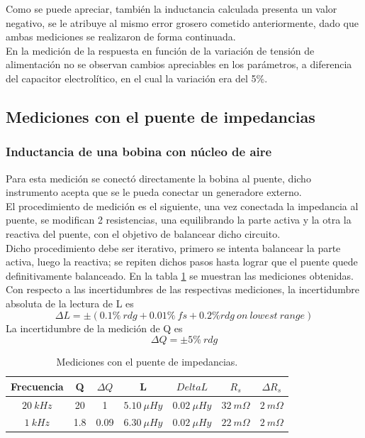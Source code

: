 \documentclass[a4paper,10pt]{article}
\begin{document}
		\indent Como se puede apreciar, también la inductancia calculada 
		presenta un valor negativo, se le atribuye al mismo error grosero 
		cometido anteriormente, dado que ambas mediciones se realizaron de forma
		continuada. \\ 
		\indent En la medición de la respuesta en función de la variación de 
		tensión de alimentación no se observan cambios apreciables en los 
		parámetros, a diferencia del capacitor electrolítico, en el cual la 
		variación era del 5\%.
	
	\subsection{Mediciones con el puente de impedancias}
		\subsubsection{Inductancia de una bobina con n\'ucleo de aire}
		\indent Para esta medición se conectó directamente la bobina al puente, 
		dicho instrumento acepta que se le pueda conectar un generadore externo.
		\\
		\indent El procedimiento de medición es el siguiente, una vez conectada
		la impedancia al puente, se modifican 2 resistencias, una equilibrando
		la parte activa y la otra la reactiva del puente, con el objetivo de 
		balancear dicho circuito. \\
		\indent Dicho procedimiento debe ser iterativo, primero se intenta 
		balancear la parte activa, luego la reactiva; se repiten dichos pasos
		hasta lograr que el puente quede definitivamente balanceado. En la 
		tabla \ref{tabPUENTEbobina} se muestran las mediciones obtenidas. \\
		\indent Con respecto a las incertidumbres de las respectivas mediciones,
		la incertidumbre absoluta de la lectura de L es 
		$$\Delta L = \pm (0.1\%~rdg +0.01\%~fs +0.2\%rdg~on~lowest~range)$$
		\indent La incertidumbre de la medición de Q es 
		$$\Delta Q = \pm5\%~rdg$$

		\begin{table}[!htp]
			\centering
			\begin{tabular}{|c|c|c|c|c|c|c|}
				\hline
				Frecuencia & Q & $\Delta Q$ & L & $Delta L$  & $R_s$ & 
				$\Delta R_s $ \\
				\hline
				$20~kHz$& 20 & 1 & $5.10~\mu Hy$ & $0.02~\mu Hy$ & 
				$ 32~m\Omega$ & $2~m\Omega$\\
				\hline
				$1~kHz$& 1.8 & 0.09 & $6.30~\mu Hy$ & $0.02~\mu Hy$ & 
				$ 22~m\Omega$ & $2~m\Omega$\\
				\hline	  
			\end{tabular}
			\caption{Mediciones con el puente de impedancias.} 
			\label{tabPUENTEbobina}
		\end{table}	
		
\end{document}
